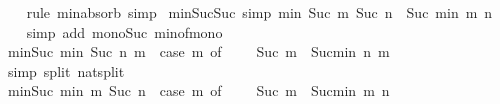 \begin{isabellebody}
\isadelimproof
\ \ %
\endisadelimproof
%
\isatagproof
{}\isamarkupfalse%
\ {\isacharparenleft}{\kern0pt}rule\ min{\isacharunderscore}{\kern0pt}absorb{}{\isacharparenright}{\kern0pt}\ simp%
\endisatagproof
{\isafoldproof}%
%
\isadelimproof
\isanewline
%
\endisadelimproof
\isanewline
{}\isamarkupfalse%
\ min{\isacharunderscore}{\kern0pt}Suc{\isacharunderscore}{\kern0pt}Suc\ {\isacharbrackleft}{\kern0pt}simp{\isacharbrackright}{\kern0pt}{\isacharcolon}{\kern0pt}\ {\isachardoublequoteopen}min\ {\isacharparenleft}{\kern0pt}Suc\ m{\isacharparenright}{\kern0pt}\ {\isacharparenleft}{\kern0pt}Suc\ n{\isacharparenright}{\kern0pt}\ {\isacharequal}{\kern0pt}\ Suc\ {\isacharparenleft}{\kern0pt}min\ m\ n{\isacharparenright}{\kern0pt}{\isachardoublequoteclose}\isanewline
%
\isadelimproof
\ \ %
\endisadelimproof
%
\isatagproof
{}\isamarkupfalse%
\ {\isacharparenleft}{\kern0pt}simp\ add{\isacharcolon}{\kern0pt}\ mono{\isacharunderscore}{\kern0pt}Suc\ min{\isacharunderscore}{\kern0pt}of{\isacharunderscore}{\kern0pt}mono{\isacharparenright}{\kern0pt}%
\endisatagproof
{\isafoldproof}%
%
\isadelimproof
\isanewline
%
\endisadelimproof
\isanewline
{}\isamarkupfalse%
\ min{\isacharunderscore}{\kern0pt}Suc{}{\isacharcolon}{\kern0pt}\ {\isachardoublequoteopen}min\ {\isacharparenleft}{\kern0pt}Suc\ n{\isacharparenright}{\kern0pt}\ m\ {\isacharequal}{\kern0pt}\ {\isacharparenleft}{\kern0pt}case\ m\ of\ {}\ {\isasymRightarrow}\ {}\ {\isacharbar}{\kern0pt}\ Suc\ m{\isacharprime}{\kern0pt}\ {\isasymRightarrow}\ Suc{\isacharparenleft}{\kern0pt}min\ n\ m{\isacharprime}{\kern0pt}{\isacharparenright}{\kern0pt}{\isacharparenright}{\kern0pt}{\isachardoublequoteclose}\isanewline
%
\isadelimproof
\ \ %
\endisadelimproof
%
\isatagproof
{}\isamarkupfalse%
\ {\isacharparenleft}{\kern0pt}simp\ split{\isacharcolon}{\kern0pt}\ nat{\isachardot}{\kern0pt}split{\isacharparenright}{\kern0pt}%
\endisatagproof
{\isafoldproof}%
%
\isadelimproof
\isanewline
%
\endisadelimproof
\isanewline
{}\isamarkupfalse%
\ min{\isacharunderscore}{\kern0pt}Suc{}{\isacharcolon}{\kern0pt}\ {\isachardoublequoteopen}min\ m\ {\isacharparenleft}{\kern0pt}Suc\ n{\isacharparenright}{\kern0pt}\ {\isacharequal}{\kern0pt}\ {\isacharparenleft}{\kern0pt}case\ m\ of\ {}\ {\isasymRightarrow}\ {}\ {\isacharbar}{\kern0pt}\ Suc\ m{\isacharprime}{\kern0pt}\ {\isasymRightarrow}\ Suc{\isacharparenleft}{\kern0pt}min\ m{\isacharprime}{\kern0pt}\ n{\isacharparenright}{\kern0pt}{\isacharparenright}{\kern0pt}{\isachardoublequoteclose}\isanewline

\end{isabellebody}
